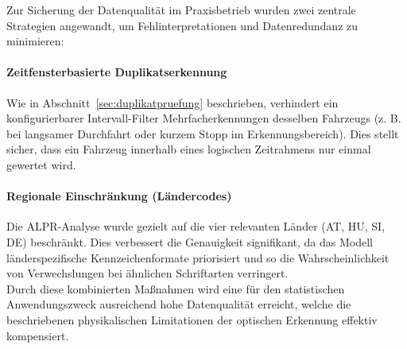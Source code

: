 Zur Sicherung der Datenqualität im Praxisbetrieb wurden zwei zentrale Strategien angewandt, um Fehlinterpretationen und Datenredundanz zu minimieren:

\paragraph{Zeitfensterbasierte Duplikatserkennung}
Wie in Abschnitt~\ref{sec:duplikatpruefung} beschrieben, verhindert ein konfigurierbarer Intervall-Filter Mehrfacherkennungen desselben Fahrzeugs (z. B. bei langsamer Durchfahrt oder kurzem Stopp im Erkennungsbereich). Dies stellt sicher, dass ein Fahrzeug innerhalb eines logischen Zeitrahmens nur einmal gewertet wird.

\paragraph{Regionale Einschränkung (Ländercodes)}
Die ALPR-Analyse wurde gezielt auf die vier relevanten Länder (AT, HU, SI, DE) beschränkt. Dies verbessert die Genauigkeit signifikant, da das Modell länderspezifische Kennzeichenformate priorisiert und so die Wahrscheinlichkeit von Verwechslungen bei ähnlichen Schriftarten verringert. \\

Durch diese kombinierten Maßnahmen wird eine für den statistischen Anwendungszweck ausreichend hohe Datenqualität erreicht, welche die beschriebenen physikalischen Limitationen der optischen Erkennung effektiv kompensiert.